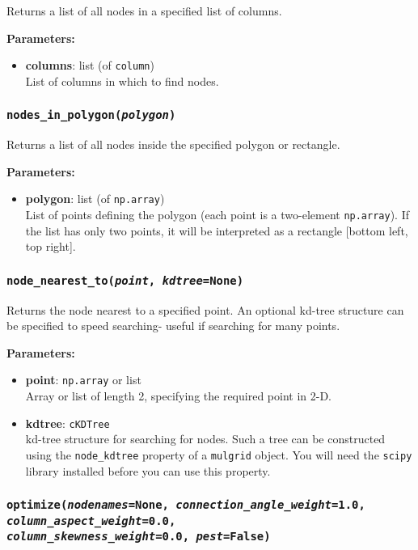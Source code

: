Returns a list of all nodes in a specified list of columns.

\textbf{Parameters:}
\begin{itemize}
\item \textbf{columns}: list (of \texttt{column})\\
  List of columns in which to find nodes.
\end{itemize}

\subsubsection{\texttt{nodes\_in\_polygon(\emph{polygon})}}

Returns a list of all nodes inside the specified polygon or rectangle.

\textbf{Parameters:}
\begin{itemize}
\item \textbf{polygon}: list (of \texttt{np.array})\\
  List of points defining the polygon (each point is a two-element \texttt{np.array}).  If the list has only two points, it will be interpreted as a rectangle [bottom left, top right].
\end{itemize}

\subsubsection{\texttt{node\_nearest\_to(\emph{point}, \emph{kdtree}=None)}}

Returns the node nearest to a specified point.  An optional kd-tree structure can be specified to speed searching- useful if searching for many points.

\textbf{Parameters:}
\begin{itemize}
\item \textbf{point}:  \texttt{np.array} or list\\
  Array or list of length 2, specifying the required point in 2-D.
\item \textbf{kdtree}:  \texttt{cKDTree}\\
  kd-tree structure for searching for nodes.  Such a tree can be constructed using the \texttt{node\_kdtree} property of a \texttt{mulgrid} object.  You will need the \texttt{scipy} library installed before you can use this property.
\end{itemize}

\subsubsection{\texttt{optimize(\emph{nodenames}=None, \emph{connection\_angle\_weight}=1.0, \emph{column\_aspect\_weight}=0.0,\\
    \emph{column\_skewness\_weight}=0.0, \emph{pest}=False)}}

